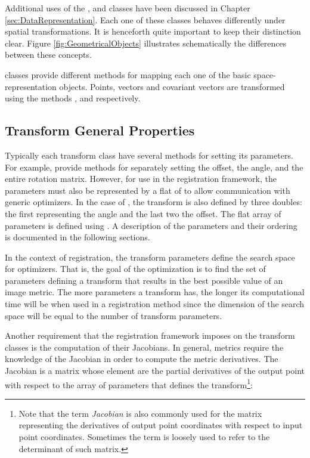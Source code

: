 Additional uses of the ,  and 
classes have been discussed in Chapter \ref{sec:DataRepresentation}.  Each one
of these classes behaves differently under spatial transformations. It is
henceforth quite important to keep their distinction clear. Figure
\ref{fig:GeometricalObjects} illustrates schematically the differences between
these concepts.



 classes provide different methods for mapping each one of
the basic space-representation objects.  Points, vectors and covariant vectors
are transformed using the methods ,
 and  respectively.

\subsection{Transform General Properties}
\label{sec:TransformGeneralProperties}

 Typically each transform class have
several methods for setting its parameters.  For example,
 provide methods for separately setting the offset,
the angle, and the entire rotation matrix.  However, for use in the
registration framework, the parameters must also be represented by a flat
 of  to allow communication with generic
optimizers. In the case of , the transform is also
defined by three doubles: the first representing the angle and the last two the
offset. The flat array of parameters is defined using . A
description of the parameters and their ordering is documented in the following
sections.
 
In the context of registration, the transform parameters define the search
space for optimizers. That is, the goal of the optimization is to find the set
of parameters defining a transform that results in the best possible value of
an image metric. The more parameters a transform has, the longer its
computational time will be when used in a registration method since the
dimension of the search space will be equal to the number of transform
parameters.


Another requirement that the registration framework imposes on the transform
classes is the computation of their Jacobians. In general, metrics require the
knowledge of the Jacobian in order to compute the metric derivatives.  The
Jacobian is a matrix whose element are the partial derivatives of the output
point with respect to the array of parameters that defines the
transform\footnote{Note that the term \emph{Jacobian} is also commonly used for
the matrix representing the derivatives of output point coordinates with
respect to input point coordinates. Sometimes the term is loosely used to refer
to the determinant of such matrix.}:

